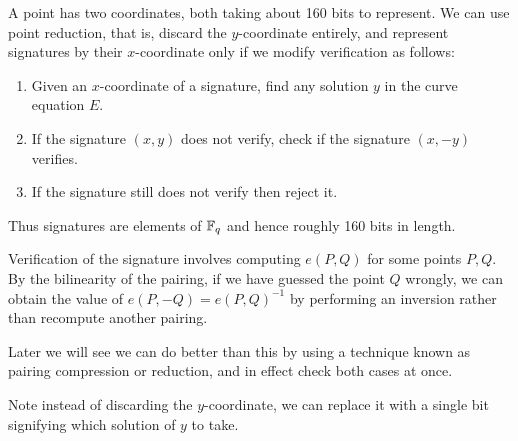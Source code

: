 A point has two coordinates, both taking about 160 bits to represent.
We can use point reduction, that is, discard the $y$-coordinate entirely,
and represent signatures by their $x$-coordinate only if we modify
verification as follows:
\begin{enumerate}
\item
Given an $x$-coordinate of a signature, find any solution $y$
in the curve equation $E$.
\item
If the signature $(x,y)$ does not verify,
check if the signature $(x, -y)$ verifies.
\item
If the signature still does not verify then reject it.
\end{enumerate}

Thus signatures are elements of $\mathbb{F}_q$ and hence roughly 160 bits in length.

Verification of the signature involves computing $e(P, Q)$ for some points
$P, Q$. By the bilinearity of the pairing, if we have guessed the point $Q$
wrongly, we can obtain the value of $e(P,-Q) = e(P,Q)^{-1}$ by performing
an inversion rather than recompute another pairing.

Later we will see we can do better than this by using a technique known
as pairing compression or reduction, and in effect check both
cases at once.

Note instead of discarding the $y$-coordinate, we can
replace it with a single bit signifying which solution of $y$ to take.
